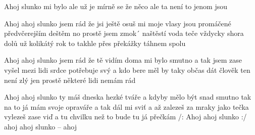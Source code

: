 \begin{TEXT}{Ahoj slunko}
\SLOKA {}  \NL
{} \NL
{} mi bylo \NL
ale  už je  mírně \NL
{} se \NL
že něco  ale  \NL
{} ta není \NL
to jenom   jsou 

\SLOKA Ahoj ahoj slunko\NL
jsem rád že jsi ještě\NL
osuš mi moje vlasy\NL
jsou promáčené předvčerejším deštěm\NL
no prostě jsem zmok´\NL
naštěstí voda teče vždycky shora dolů\NL
už kolikátý rok\NL
to takhle přes překážky táhnem spolu

\SLOKA Ahoj ahoj slunko\NL
jsem rád že tě vidím\NL
doma mi bylo smutno\NL
a tak jsem zase vyšel mezi lidi\NL
srdce potřebuje svý\NL
a kdo bere měl by taky občas dát\NL
člověk ten není zlý\NL
jen prostě některé lidi nemám rád

\SLOKA Ahoj ahoj slunko\NL
ty máš dneska hezké tváře\NL
a kdyby mělo být snad smutno\NL
tak na to já mám svoje opraváře\NL
a tak dál mi sviť\NL
a až zalezeš za mraky jako tečka\NL
vylezeš zase viď\NL
a tu chvilku než to bude tu já přečkám\NL
/: Ahoj ahoj slunko :/\NL
ahoj ahoj slunko – ahoj
\end{TEXT}